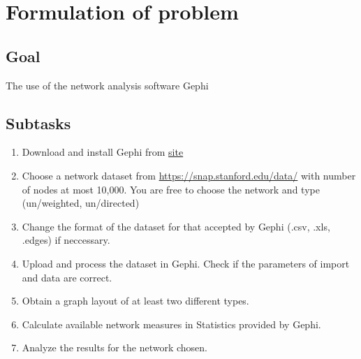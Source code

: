 \section*{Formulation of problem}

\subsection*{Goal}

The use of the network analysis software Gephi

\subsection*{Subtasks}
\begin{enumerate}
    \item Download and install Gephi from \href{https://gephi.org/.}{site}
    \item Choose a network dataset from \href{https://snap.stanford.edu/data/}{https://snap.stanford.edu/data/} with number
    of nodes at most 10,000. You are free to choose the network and type (un/weighted, un/directed)
    \item Change the format of the dataset for that accepted by Gephi (.csv, .xls, .edges) if neccessary.
    \item Upload and process the dataset in Gephi. Check if the parameters of import and data are correct.
    \item Obtain a graph layout of at least two different types.
    \item Calculate available network measures in Statistics provided by Gephi.
    \item Analyze the results for the network chosen.
\end{enumerate}